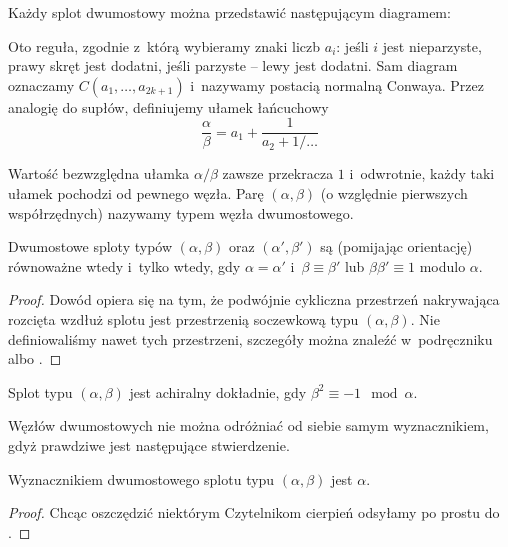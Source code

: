 Każdy splot dwumostowy można przedstawić następującym diagramem:



Oto reguła, zgodnie z~którą wybieramy znaki liczb $a_i$:
jeśli $i$ jest nieparzyste, prawy skręt jest dodatni, jeśli parzyste -- lewy jest dodatni.
Sam diagram oznaczamy $C(a_1, \ldots, a_{2k+1})$ i~nazywamy postacią normalną Conwaya.
Przez analogię do supłów, definiujemy ułamek łańcuchowy
\[
    \frac \alpha \beta = a_1 + \frac{1}{a_2 + 1/\ldots}
\]

Wartość bezwzględna ułamka $\alpha/\beta$ zawsze przekracza $1$ i~odwrotnie, każdy taki ułamek pochodzi od pewnego węzła.
Parę $(\alpha, \beta)$ (o względnie pierwszych współrzędnych) nazywamy typem węzła dwumostowego.

\begin{proposition}
\label{prp:tangle_equivalence}
    Dwumostowe sploty typów $(\alpha, \beta)$ oraz $(\alpha', \beta')$ są (pomijając orientację) równoważne wtedy i~tylko wtedy, gdy $\alpha = \alpha'$ i~$\beta \equiv \beta'$ lub $\beta \beta'\equiv 1$ modulo $\alpha$.
\end{proposition}

\begin{proof}
    Dowód opiera się na tym, że podwójnie cykliczna przestrzeń nakrywająca rozcięta wzdłuż splotu jest przestrzenią soczewkową typu $(\alpha, \beta)$.
    Nie definiowaliśmy nawet tych przestrzeni, szczegóły można znaleźć w~podręczniku \cite{murasugi96} albo \cite{schubert56}.
\end{proof}

\begin{proposition}
\label{prp:chiral_tangles}
    Splot typu $(\alpha, \beta)$ jest achiralny dokładnie, gdy $\beta^2 \equiv -1 \mod \alpha$.
\end{proposition}

Węzłów dwumostowych nie można odróżniać od siebie samym wyznacznikiem, gdyż prawdziwe jest następujące stwierdzenie.

\begin{proposition}
\label{prp:tangle_determinant}
    Wyznacznikiem dwumostowego splotu typu $(\alpha, \beta)$ jest $\alpha$.
\end{proposition}

\begin{proof}
    Chcąc oszczędzić niektórym Czytelnikom cierpień odsyłamy po prostu do \cite{schubert56}.
\end{proof}

